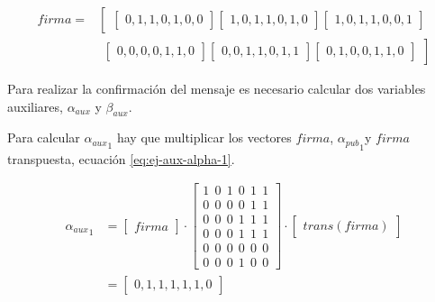 \begin{equation}\label{eq:ej-firma}
	\begin{aligned}
	{firma} = &
		\left[\begin{array}{c}
			\left[\begin{array}{c}0, 1, 1, 0, 1, 0, 0\end{array}\right]			
			\left[\begin{array}{c}1, 0, 1, 1, 0, 1, 0\end{array}\right]
			\left[\begin{array}{c}1, 0, 1, 1, 0, 0, 1\end{array}\right]\end{array}\right.\\
			& \left.\begin{array}{c}\left[\begin{array}{c}0, 0, 0, 0, 1, 1, 0\end{array}\right]			
			\left[\begin{array}{c}0, 0, 1, 1, 0, 1, 1\end{array}\right]
			\left[\begin{array}{c}0, 1, 0, 0, 1, 1, 0\end{array}\right]
		\end{array}\right]
	\end{aligned}
\end{equation}

Para realizar la confirmación del mensaje es necesario calcular dos variables auxiliares, $\alpha_{aux}$ y $\beta_{aux}$.

Para calcular ${\alpha_{aux}}_1$ hay que multiplicar los vectores $firma$, ${\alpha_{pub}}_1$y $firma$ transpuesta, ecuación \ref{eq:ej-aux-alpha-1}.

\begin{equation}\label{eq:ej-aux-alpha-1}
	\begin{aligned}
	{{\alpha_{aux}}_1} & = 
		\left[\begin{array}{c}firma\end{array}\right]
		\cdot \left[\begin{array}{c}
			1\ \ 0\ \ 1\ \ 0\ \ 1\ \ 1\\
			0\ \ 0\ \ 0\ \ 0\ \ 1\ \ 1\\
			0\ \ 0\ \ 0\ \ 1\ \ 1\ \ 1\\
			0\ \ 0\ \ 0\ \ 1\ \ 1\ \ 1\\
			0\ \ 0\ \ 0\ \ 0\ \ 0\ \ 0\\
			0\ \ 0\ \ 0\ \ 1\ \ 0\ \ 0
		\end{array}\right]
		\cdot \left[\begin{array}{c}trans\left(firma\right)\end{array}\right]\\
		& = \left[\begin{array}{c}0, 1, 1, 1, 1, 1, 0\end{array}\right]
	\end{aligned}
\end{equation}

